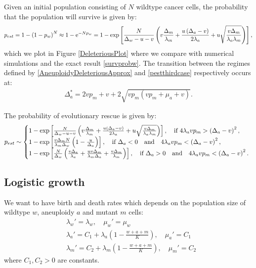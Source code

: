 \documentclass[12pt]{extarticle}
\newcommand{\e}{{\rm e}}
\begin{document}
Given an initial population consisting of $N$ wildtype cancer cells, the probability that the population will survive is given by: 
\begin{align}\label{pestthirdcase}
p_{est}=1-\left(1-p_w\right)^N\approx 1-\e^{-Np_w}=1-\exp\left[\frac{N}{\Delta_w-u-v}\left(v\frac{\Delta_m}{\lambda_m}+\frac{u\left(\Delta_a-v\right)}{2\lambda_a}+u\sqrt{\frac{v\Delta_m}{\lambda_a\lambda_m}}\right)\right],
\end{align}
which we plot in Figure \ref{DeleteriousPlot} where we compare with numerical simulations and the exact result \eqref{survprobw}. The transition between the regimes defined by \eqref{AneuploidyDeleteriousApprox} and \eqref{pestthirdcase} respectively occurs at:
\begin{align}
\Delta_a^*=2vp_m+v+2\sqrt{vp_m\left(vp_m+\mu_a+v\right)}.
\end{align}

The probability of evolutionary rescue is given by:
\begin{equation}
p_{est}\sim\left\{
  \begin{array}{@{}ll@{}}
  1-\exp\left[\frac{N}{\Delta_w-u-v}\left(v\frac{\Delta_m}{\lambda_m}+\frac{u\left(\Delta_a-v\right)}{2\lambda_a}+u\sqrt{\frac{v\Delta_m}{\lambda_a\lambda_m}}\right)\right],\quad\text{if }4\lambda_avp_m>\left(\Delta_a-v\right)^2,\\
   1-\exp\left[\frac{v\Delta_mN}{\lambda_m\Delta_w}\left(1-\frac{u}{\Delta_a}\right)\right],\quad\text{if }\Delta_a<0\quad\text{and}\quad4\lambda_avp_m<\left(\Delta_a-v\right)^2,\\
   1-\exp\left[\frac{N}{\Delta_w}\left(\frac{v\Delta_a}{\lambda_a}+\frac{uv\Delta_m}{\lambda_m\Delta_a}+\frac{v\Delta_m}{\lambda_m}\right)\right],\quad\text{if }\Delta_a>0\quad\text{and}\quad4\lambda_avp_m<\left(\Delta_a-v\right)^2.
  \end{array}\right.
\end{equation}

\subsection*{Logistic growth}
We want to have birth and death rates which depends on the population size of wildtype $w$, aneuploidy $a$ and mutant $m$ cells:
\begin{align*}
&\lambda_w'=\lambda_w,\quad\mu_w'=\mu_w\\
&\lambda_a'=C_1+\lambda_a\left(1-\frac{w+a+m}{K}\right),\quad \mu_a'=C_1\\
&\lambda_m'=C_2+\lambda_m\left(1-\frac{w+a+m}{K}\right),\quad \mu_m'=C_2
\end{align*}
where $C_1, C_2>0$ are constants.
\end{document}
